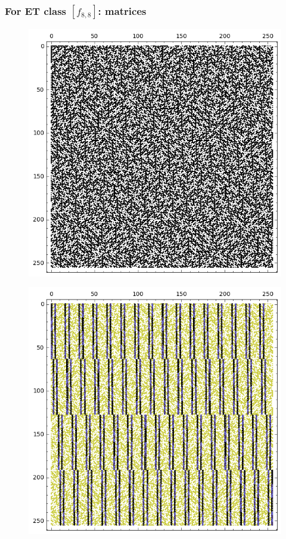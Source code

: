 \documentclass[pdf,sprung,slideColor,nocolorBG]{beamer}
\newenvironment{colortheme}[1]{
\def\ProvidesPackageRCS $##1${\relax}
\renewcommand{\ProcessOptions}{\relax}
\makeatletter

\makeatother
}{}
\begin{document}
\begin{colortheme}{jubata}
\begin{frame}
\begin{figure}
\begin{minipage}{.48\textwidth}
  \label{fig:8_7_bent_cayley_graph_index_matrix}
\end{minipage}
\end{figure}
~
\end{frame}
\begin{frame}
\frametitle{For ET class $[f_{8,8}]$: matrices}
\begin{figure}
\centering
\begin{minipage}{.48\textwidth}
  \centering
  \includegraphics[width=.9\linewidth]{../matrix_plot/c8_8_weight_class_matrix.png}
  \label{fig:8_8_weight_class_matrix}
\end{minipage}%
\begin{minipage}{.48\textwidth}
  \centering
  \includegraphics[width=.9\linewidth]{../matrix_plot/c8_8_bent_cayley_graph_index_matrix.png}

\end{minipage}
\end{figure}
\end{frame}
\end{colortheme}
\end{document}
